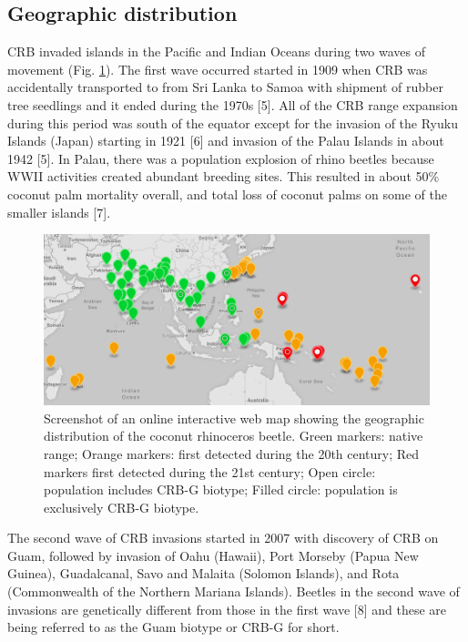 \documentclass[twocolumn,letterpaper]{scrartcl}
\begin{document}
\subsection{Geographic distribution}

CRB invaded islands in the Pacific and Indian Oceans during two waves of movement (Fig. \ref{fig:crbdist}). The first wave occurred started in 1909 when CRB was accidentally transported to from Sri Lanka to Samoa with shipment of rubber tree seedlings and it ended during the 1970s
[5]. All of the CRB range expansion during this period was south of the equator except for the invasion of the Ryuku Islands (Japan) starting in 1921 [6] and invasion of the Palau Islands in about 1942 [5]. In Palau, there was a population explosion of rhino beetles because WWII activities created abundant breeding sites. This resulted in about 50\% coconut palm mortality overall, and total loss of coconut palms on some of the smaller islands [7].

\begin{figure}
	\centering
	\includegraphics[width=\linewidth]{images/crb_dist}
	\caption{Screenshot of an online interactive web map \cite{moore_web_2019} showing the geographic distribution of the coconut rhinoceros beetle. Green markers: native range; Orange markers: first detected during the 20th century; Red markers first detected during the 21st century; Open circle: population includes CRB-G biotype; Filled circle: population is exclusively CRB-G biotype.}
	\label{fig:crbdist}
\end{figure}

The second wave of CRB invasions started in 2007 with discovery of CRB on Guam, followed by invasion of Oahu (Hawaii), Port Morseby (Papua New Guinea), Guadalcanal, Savo and Malaita (Solomon Islands), and Rota (Commonwealth of the Northern Mariana Islands). Beetles in the second wave of invasions are genetically different from those in the first wave [8] and these are being referred to as the Guam biotype or CRB-G for short.
\end{document}

